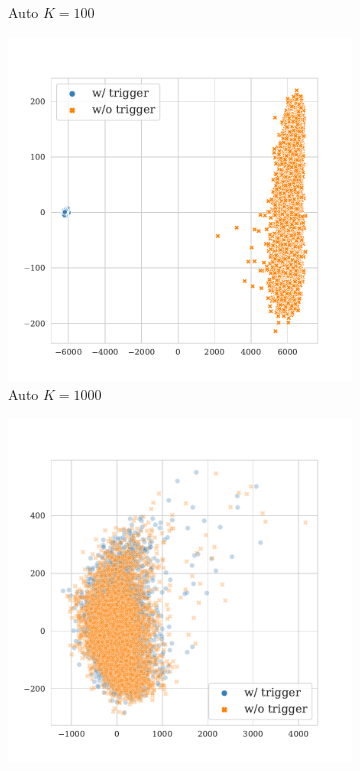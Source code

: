 \begin{figure}[!ht]
\begin{subfigure}{.33\textwidth}
  \caption{Auto $K = 100$}
  \label{fig:qnli_auto_k100_embed}
\end{subfigure}
\begin{subfigure}{.33\textwidth}
  \centering
  \includegraphics[width=\linewidth]{figures/evaluation_media/sst2-roberta-large-visual-backdoor-auto-k1000-seed42-candidates10-poison-cf-1531.pdf}
  \caption{Auto $K = 1000$}
  \label{fig:qnli_auto_k1000_embed}
\end{subfigure}
\begin{subfigure}{.33\textwidth}
  \centering
  \includegraphics[width=\linewidth]{figures/evaluation_media/qnli-roberta-large-visual-backdoor-diff-prompt-k16-seed42-poison-cf-172.pdf}

\end{subfigure}
\end{figure}
